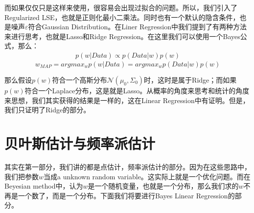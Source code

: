 \documentclass[a4paper]{article}
\begin{document}
而如果仅仅只是这样来使用，很容易会出现过拟合的问题。所以，我们引入了Regularized LSE，也就是正则化最小二乘法。同时也有一个默认的隐含条件，也是噪声$\varepsilon$符合Gaussian Distribution。在Liner Regression中我们提到了有两种方法来进行思考，也就是Lasso和Ridge Regression。在这里我们可以使用一个Bayes公式，那么：
\begin{equation}
    \begin{split}
        p(w|Data) \propto p(Data|w)p(w) 
    \end{split}
\end{equation}
\begin{equation}
    w_{MAP} = argmax_w p(w|Data) = argmax_wp(Data|w)p(w) 
\end{equation}

那么假设$p(w)$符合一个高斯分布$\mathcal{N}(\mu_0,\Sigma_0)$时，这时是属于Ridge；而如果$p(w)$符合一个Laplace分布，这是就是Lasso。从概率的角度来思考和统计的角度来思想，我们其实获得的结果是一样的，这在Linear Regression中有证明。但是，我们只证明了Ridge的部分。

\section{贝叶斯估计与频率派估计}
其实在第一部分，我们讲的都是点估计，频率派估计的部分。因为在这些思路中，我们把参数$w$当成a unknown random variable。这实际上就是一个优化问题。而在Beyesian method中，认为$w$是一个随机变量，也就是一个分布，那么我们求的$w$不再是一个数了，而是一个分布。下面我们将要进行Bayes Linear Regression的部分。
\end{document}
